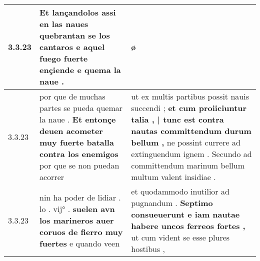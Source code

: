 \begin{tabular}{|p{1cm}|p{6.5cm}|p{6.5cm}|}
3.3.23 & Et lançandolos assi en las naues quebrantan se los cantaros \textbf{ e aquel fuego fuerte ençiende } e quema la naue . & ø \\\hline
3.3.23 & por que de muchas partes se pueda quemar la naue . \textbf{ Et entonçe deuen acometer muy fuerte batalla contra los enemigos } por que se non puedan acorrer & ut ex multis partibus possit nauis succendi ; \textbf{ et cum proiiciuntur talia , | tunc est contra nautas committendum durum bellum , } ne possint currere ad extinguendum ignem . Secundo ad committendum marinum bellum multum valent insidiae . \\\hline
3.3.23 & nin ha poder de lidiar . lo . vij° . \textbf{ suelen avn los marineros auer coruos de fierro muy fuertes } e quando veen & et quodammodo inutilior ad pugnandum . \textbf{ Septimo consueuerunt e iam nautae habere uncos ferreos fortes , } ut cum vident se esse plures hostibus , \\\hline

\end{tabular}
